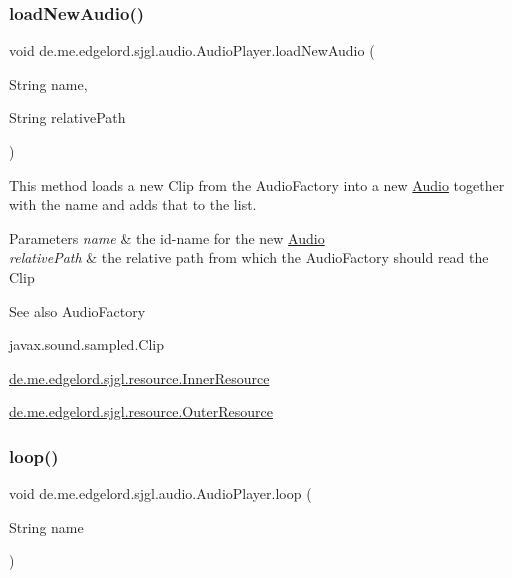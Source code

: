 \subsubsection{\texorpdfstring{load\+New\+Audio()}{loadNewAudio()}}
{\footnotesize\ttfamily void de.\+me.\+edgelord.\+sjgl.\+audio.\+Audio\+Player.\+load\+New\+Audio (\begin{DoxyParamCaption}\item[{String}]{name,  }\item[{String}]{relative\+Path }\end{DoxyParamCaption})}

This method loads a new {\ttfamily Clip} from the {\ttfamily Audio\+Factory} into a new {\ttfamily \mbox{\hyperlink{classde_1_1me_1_1edgelord_1_1sjgl_1_1audio_1_1_audio}{Audio}}} together with the name and adds that to the list.


\begin{DoxyParams}{Parameters}
{\em name} & the id-\/name for the new {\ttfamily \mbox{\hyperlink{classde_1_1me_1_1edgelord_1_1sjgl_1_1audio_1_1_audio}{Audio}}} \\
\hline
{\em relative\+Path} & the relative path from which the {\ttfamily Audio\+Factory} should read the {\ttfamily Clip}\\
\hline
\end{DoxyParams}
\begin{DoxySeeAlso}{See also}
Audio\+Factory 

javax.\+sound.\+sampled.\+Clip 

\mbox{\hyperlink{classde_1_1me_1_1edgelord_1_1sjgl_1_1resource_1_1_inner_resource}{de.\+me.\+edgelord.\+sjgl.\+resource.\+Inner\+Resource}} 

\mbox{\hyperlink{classde_1_1me_1_1edgelord_1_1sjgl_1_1resource_1_1_outer_resource}{de.\+me.\+edgelord.\+sjgl.\+resource.\+Outer\+Resource}} 
\end{DoxySeeAlso}
\mbox{\label{classde_1_1me_1_1edgelord_1_1sjgl_1_1audio_1_1_audio_player_a4773c3bc2054fcb5f7892ebf330c68b8}} 
\subsubsection{\texorpdfstring{loop()}{loop()}}
{\footnotesize\ttfamily void de.\+me.\+edgelord.\+sjgl.\+audio.\+Audio\+Player.\+loop (\begin{DoxyParamCaption}\item[{String}]{name }\end{DoxyParamCaption})}

